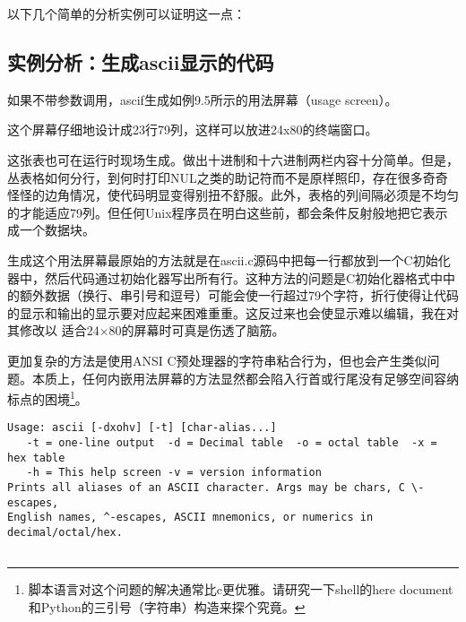 \documentclass[12pt,oneside]{ctexbook}
\begin{document}
\begin{common-format}
以下几个简单的分析实例可以证明这一点：

\subsection{实例分析：生成ascii显示的代码}
如果不带参数调用，ascif生成如例9.5所示的用法屏幕（usage screen）。

这个屏幕仔细地设计成23行79列，这样可以放进24x80的终端窗口。

这张表也可在运行时现场生成。做出十进制和十六进制两栏内容十分简单。但是，丛表格如何分行，到何时打印NUL之类的助记符而不是原样照印，存在很多奇奇怪怪的边角情况，使代码明显变得别扭不舒服。此外，表格的列间隔必须是不均匀的才能适应79列。但任何Unix程序员在明白这些前，都会条件反射般地把它表示成一个数据块。

生成这个用法屏幕最原始的方法就是在ascii.c源码中把每一行都放到一个C初始化器中，然后代码通过初始化器写出所有行。这种方法的问题是C初始化器格式中中的额外数据（换行、串引号和逗号）可能会使一行超过79个字符，折行使得让代码的显示和输出的显示要对应起来困难重重。这反过来也会使显示难以编辑，我在对其修改以
适合24×80的屏幕时可真是伤透了脑筋。

更加复杂的方法是使用ANSI C预处理器的字符串粘合行为，但也会产生类似问题。本质上，任何内嵌用法屏幕的方法显然都会陷入行首或行尾没有足够空间容纳标点的困境\footnote{脚本语言对这个问题的解决通常比c更优雅。请研究一下shell的here document和Python的三引号（字符串）构造来探个究竟。}。

\begin{Verbatim}[label=例9.5 ascii用法屏幕]
Usage: ascii [-dxohv] [-t] [char-alias...]
   -t = one-line output  -d = Decimal table  -o = octal table  -x = hex table
   -h = This help screen -v = version information
Prints all aliases of an ASCII character. Args may be chars, C \-escapes,
English names, ^-escapes, ASCII mnemonics, or numerics in decimal/octal/hex.


\end{Verbatim}
\end{common-format}
\end{document}
